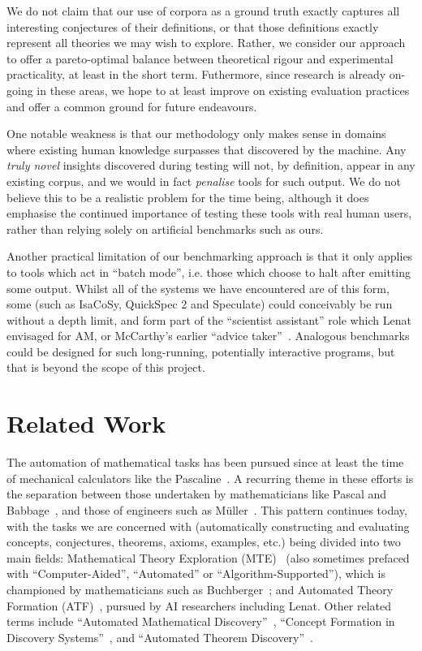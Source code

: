 We do not claim that our use of corpora as a ground truth exactly captures all
interesting conjectures of their definitions, or that those definitions exactly
represent all theories we may wish to explore. Rather, we consider our approach
to offer a pareto-optimal balance between theoretical rigour and experimental
practicality, at least in the short term. Futhermore, since research is already
on-going in these areas, we hope to at least improve on existing evaluation
practices and offer a common ground for future endeavours.

One notable weakness is that our methodology only makes sense in domains where
existing human knowledge surpasses that discovered by the machine. Any
\emph{truly novel} insights discovered during testing will not, by definition,
appear in any existing corpus, and we would in fact \emph{penalise} tools for
such output. We do not believe this to be a realistic problem for the time
being, although it does emphasise the continued importance of testing these
tools with real human users, rather than relying solely on artificial benchmarks
such as ours.

Another practical limitation of our benchmarking approach is that it only
applies to tools which act in ``batch mode'', i.e. those which choose to halt
after emitting some output. Whilst all of the systems we have encountered are of
this form, some (such as IsaCoSy, QuickSpec 2 and Speculate) could conceivably
be run without a depth limit, and form part of the ``scientist assistant'' role
which Lenat envisaged for AM, or McCarthy's earlier ``advice
taker''~\cite{McCarthy_Programs59}. Analogous benchmarks could be designed for
such long-running, potentially interactive programs, but that is beyond the
scope of this project.

\section{Related Work}
\label{sec:related-work}

The automation of mathematical tasks has been pursued since at least the time of
mechanical calculators like the Pascaline~\cite{d'ocagne}. A recurring theme in
these efforts is the separation between those undertaken by mathematicians like
Pascal and Babbage~\cite{bowden}, and those of engineers such as
M\"uller~\cite[p. 65]{lindgren}. This pattern continues today, with the tasks we
are concerned with (automatically constructing and evaluating concepts,
conjectures, theorems, axioms, examples, etc.) being divided into two main
fields: Mathematical Theory Exploration (MTE)~\cite{buchberger:06} (also
sometimes prefaced with ``Computer-Aided'', ``Automated'' or
``Algorithm-Supported''), which is championed by mathematicians such as
Buchberger~\cite{buchberger}; and Automated Theory Formation
(ATF)~\cite{lenat:77,colton:book}, pursued by AI researchers including Lenat.
Other related terms include ``Automated Mathematical
Discovery''~\cite{epstein:91,colton:interestingness,esarm2008},
``Concept Formation in Discovery Systems''~\cite{haase}, and
``Automated Theorem Discovery''~\cite{roy}.

